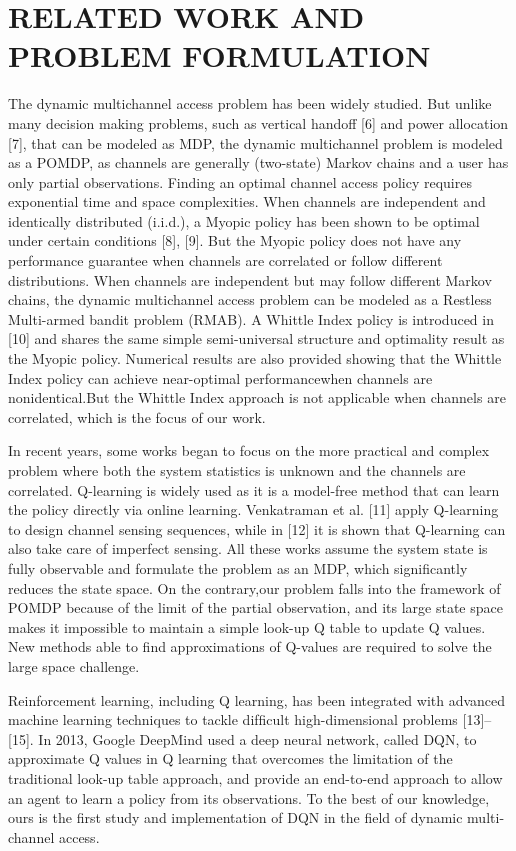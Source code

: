 \section*{  RELATED WORK AND  PROBLEM FORMULATION  }
The dynamic multichannel access problem has been widely studied. But unlike many decision making problems, such as vertical handoff [6] and power allocation [7], that can
be modeled as MDP, the dynamic multichannel problem is modeled as a POMDP, as channels are generally (two-state) Markov chains and a user has only partial observations. Finding an optimal channel access policy requires exponential time and space complexities. When channels are independent and identically distributed (i.i.d.), a Myopic policy has been shown to be optimal under certain conditions [8], [9]. But the Myopic policy does not have any performance guarantee when channels are correlated or follow different distributions. When channels are independent but may follow different Markov chains, the dynamic multichannel access problem can be modeled as a Restless Multi-armed bandit problem (RMAB). A Whittle Index policy is introduced in [10] and shares the same simple semi-universal structure and optimality result as the Myopic policy. Numerical results are also provided showing that the Whittle Index policy can achieve near-optimal performancewhen channels are nonidentical.But the Whittle Index approach is not applicable when channels are correlated, which is the focus of our work. 

In recent years, some works began to focus on the more practical and complex problem where both the system statistics is unknown and the channels are correlated. Q-learning is widely used as it is a model-free method that can learn the policy directly via online learning. Venkatraman et al. [11] apply Q-learning to design channel sensing sequences, while in [12] it is shown that Q-learning can also take care of imperfect sensing. All these works assume the system state is fully observable and formulate the problem as an MDP, which signiﬁcantly reduces the state space. On the contrary,our problem falls into the framework of POMDP because of the limit of the partial observation, and its large state space makes it impossible to maintain a simple look-up Q table to update Q values. New methods able to ﬁnd approximations of Q-values are required to solve the large space challenge. 

Reinforcement learning, including Q learning, has been integrated with advanced machine learning techniques to tackle difﬁcult high-dimensional problems [13]–[15]. In 2013, Google DeepMind used a deep neural network, called DQN, to approximate Q values in Q learning that overcomes the limitation of the traditional look-up table approach, and provide an end-to-end approach to allow an agent to learn a policy from its observations. To the best of our knowledge, ours is the ﬁrst study and implementation of DQN in the ﬁeld of dynamic multi-channel access.

